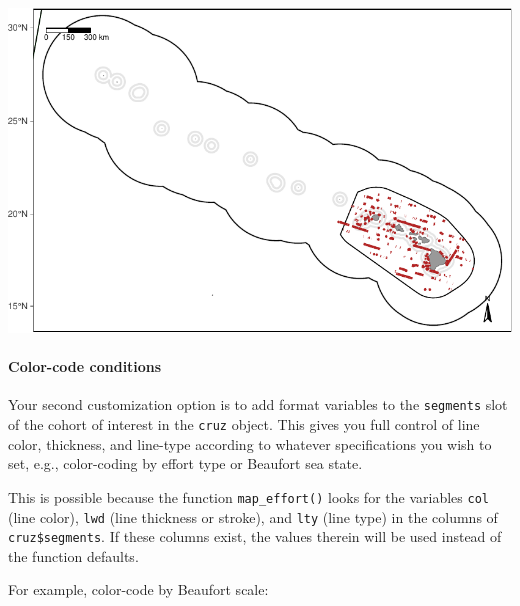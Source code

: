\documentclass[
]{book}
\begin{document}
\includegraphics{figures/unnamed-chunk-55-1.pdf}

\hypertarget{color-code-conditions}{%
\paragraph{Color-code conditions}\label{color-code-conditions}}

Your second customization option is to add format variables to the \texttt{segments} slot of the cohort of interest in the \texttt{cruz} object. This gives you full control of line color, thickness, and line-type according to whatever specifications you wish to set, e.g., color-coding by effort type or Beaufort sea state.

This is possible because the function \texttt{map\_effort()} looks for the variables \texttt{col} (line color), \texttt{lwd} (line thickness or stroke), and \texttt{lty} (line type) in the columns of \texttt{cruz\$segments}. If these columns exist, the values therein will be used instead of the function defaults.

For example, color-code by Beaufort scale:
\end{document}
